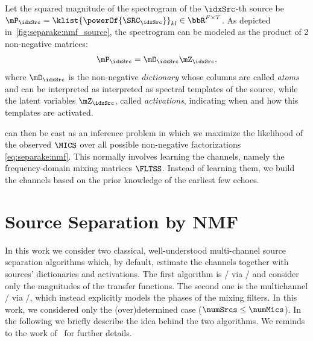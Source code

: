 \mynewline
Let the squared magnitude of the spectrogram of the $\idxSrc$-th source be $\mP_\idxSrc = \klist{\powerOf{\SRC_\idxSrc}}_{kl} \in \bbR^{F\times T}$.
As depicted in~\cref{fig:separake:nmf_source}, the spectrogram can be modeled as the product of 2 non-negative matrices:
\begin{equation}
    \label{eq:separake:nmf}
    \mP_\idxSrc =  \mD_\idxSrc \mZ_\idxSrc,
\end{equation}
where $\mD_\idxSrc$ is the non-negative \textit{dictionary} whose columns are called \textit{atoms} and can be interpreted as interpreted as spectral templates of the source,
while the latent variables $\mZ_\idxSrc$, called \textit{activations}, indicating when and how this templates are activated.

 can then be cast as an inference problem in which we maximize the likelihood of the observed $\MICS$ over all possible non-negative factorizations \eqref{eq:separake:nmf}.
This normally involves learning the channels, namely the frequency-domain mixing matrices $\FLTSS$.
Instead of learning them, we build the channels based on the prior knowledge of the earliest few echoes.

\section{Source Separation by NMF}
In this work we consider two classical, well-understood multi-channel source separation algorithms which, by default, estimate the channels together with sources' dictionaries and activations.
The first algorithm is \NMFdef/ via \MUdef/ and consider only the magnitudes of the transfer functions.
The second one is the multichannel \NMF/ via \EMdef/, which instead explicitly models the phases of the mixing filters.
In this work, we considered only the (over)determined case ($\numSrcs \leq \numMics$).
In the following we briefly describe the idea behind the two algorithms.
We reminds to the work of~ for further details.

